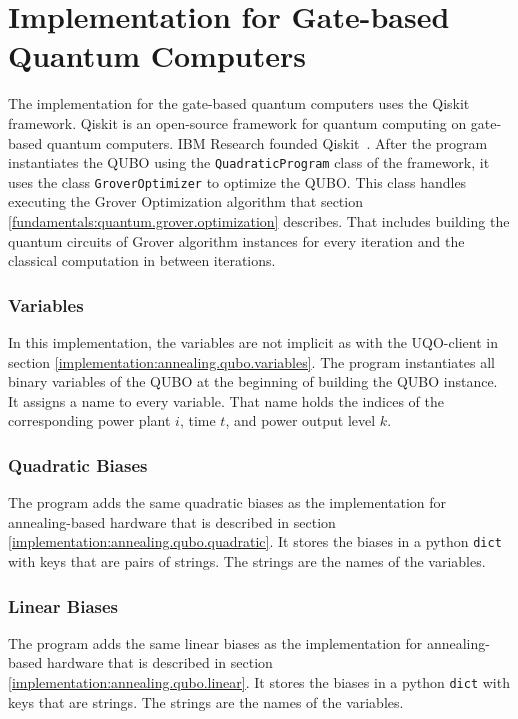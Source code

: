 \section{Implementation for Gate-based Quantum Computers}
\label{implement:gate.qubo}

The implementation for the gate-based quantum computers uses the Qiskit framework.
Qiskit is an open-source framework for quantum computing on gate-based quantum computers.
IBM Research founded Qiskit~\cite{QiskitWeb, QiskitGitHub}.
After the program instantiates the QUBO using the \texttt{QuadraticProgram} class of the framework, it uses the class \texttt{GroverOptimizer} to optimize the QUBO.
This class handles executing the Grover Optimization algorithm that section \ref{fundamentals:quantum.grover.optimization} describes.
That includes building the quantum circuits of Grover algorithm instances for every iteration and the classical computation in between iterations.

\subsubsection{Variables}

In this implementation, the variables are not implicit as with the UQO-client in section \ref{implementation:annealing.qubo.variables}.
The program instantiates all binary variables of the QUBO at the beginning of building the QUBO instance.
It assigns a name to every variable.
That name holds the indices of the corresponding power plant $i$, time $t$, and power output level $k$.

\subsubsection{Quadratic Biases}

The program adds the same quadratic biases as the implementation for annealing-based hardware that is described in section \ref{implementation:annealing.qubo.quadratic}.
It stores the biases in a python \texttt{dict} with keys that are pairs of strings.
The strings are the names of the variables.

\subsubsection{Linear Biases}

The program adds the same linear biases as the implementation for annealing-based hardware that is described in section \ref{implementation:annealing.qubo.linear}.
It stores the biases in a python \texttt{dict} with keys that are strings.
The strings are the names of the variables.

